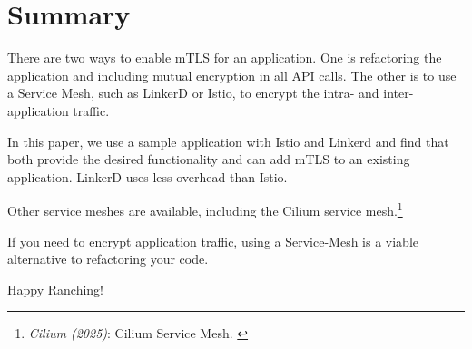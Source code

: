 %
%

\pagebreak
\section{Summary}

\onehalfspacing

There are two ways to enable mTLS for an application. One is refactoring the application and including mutual encryption in all API calls. The other is to use a Service Mesh, such as LinkerD or Istio, to encrypt the intra- and inter-application traffic.

In this paper, we use a sample application with Istio and Linkerd and find that both provide the desired functionality and can add mTLS to an existing application. LinkerD uses less overhead than Istio.

Other service meshes are available, including the Cilium service mesh.\footnote{\textit{Cilium (2025)}: Cilium Service Mesh. \cite{ciliumMesh}}

If you need to encrypt application traffic, using a Service-Mesh is a viable alternative to refactoring your code.

Happy Ranching!
